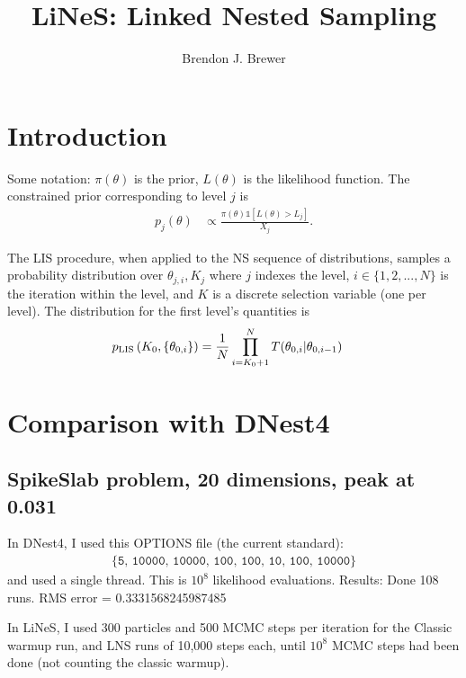 \documentclass[a4paper, 12pt]{article}
\title{LiNeS: Linked Nested Sampling}
\author{Brendon J. Brewer}
\date{}
\begin{document}
\maketitle


\setlength{\parindent}{0pt}
\setlength{\parskip}{8pt}

\section{Introduction}
Some notation: $\pi(\theta)$ is the prior, $L(\theta)$ is the
likelihood function. The constrained prior corresponding
to level $j$ is
\begin{align}
p_j(\theta) &\propto
\frac{\pi(\theta)\mathds{1}\left[L(\theta) > L_j\right]}
{X_j}.
\end{align}

The LIS procedure, when applied to the NS sequence of
distributions, samples a probability distribution over
$\theta_{j,i}, K_j$ where $j$ indexes the level,
$i \in \{1, 2, ..., N\}$ is the
iteration within the level, and $K$ is a discrete
selection variable (one per level). The distribution for the
first level's quantities is
\begin{align}
p_{\rm LIS}\left(K_0, \left\{\theta_{0,i}\right\}\right)
&= \frac{1}{N} \prod_{i=K_0+1}^N T(\theta_{0,i} | \theta_{0,i-1})
\end{align}


\section{Comparison with DNest4}

\subsection{SpikeSlab problem, 20 dimensions, peak at 0.031}
In DNest4, I used this OPTIONS file (the current standard):
\begin{align}
\{\texttt{5, 10000, 10000, 100, 100, 10, 100, 10000}\}
\end{align}
and used
a single thread. This is $10^8$ likelihood evaluations.
Results:
Done 108 runs. RMS error = 0.3331568245987485

In LiNeS, I used 300 particles and 500 MCMC steps per iteration
for the Classic warmup run, and
LNS runs of 10,000 steps each, until $10^8$ MCMC steps
had been done (not counting the classic warmup).
\end{document}
